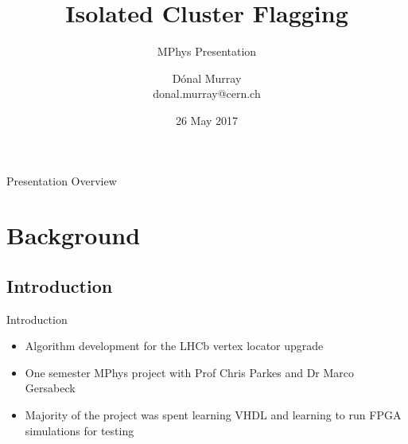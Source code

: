 \documentclass{beamer}
\title[ICF Block]{Isolated Cluster Flagging}
\subtitle{MPhys Presentation}
\author[Dónal Murray\hspace*{80pt}donal.murray@cern.ch]{Dónal Murray \\
  \vskip7pt
  \tiny{donal.murray@cern.ch}
}
\institute{}
\date{26 May 2017}
\begin{document}
{
\begin{frame}
  \titlepage
\end{frame}
}
\addtocounter{framenumber}{-1} %

\begin{frame}{Presentation Overview}
  \tableofcontents
\end{frame}





\section{Background}
\subsection{Introduction}
\begin{frame}{Introduction}
  \begin{itemize}
    \item
      Algorithm development for the LHCb vertex locator upgrade
    \item
      One semester MPhys project with Prof Chris Parkes and Dr Marco Gersabeck
    \item
      Majority of the project was spent learning VHDL and learning to run FPGA simulations for testing
    \end{itemize}
\end{frame}
\end{document}
